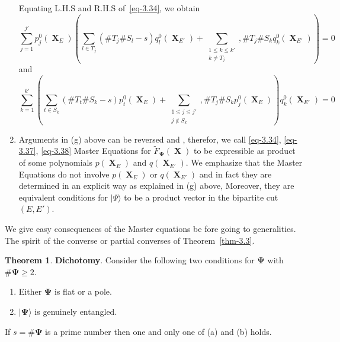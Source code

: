 \documentclass[a4paper,12pt]{article}
\DeclareMathOperator{\x}{\mathrm{X}}
\theoremstyle{definition}
\theoremstyle{underlinethm}
\newtheorem{thm}{Theorem}[section]
\theoremstyle{definition}
\begin{document}
\begin{enumerate}[label=(\alph*)]
Equating L.H.S  and R.H.S of~\eqref{eq-3.34}, we obtain
\begin{equation}
\sum_{j=1}^{j'} p_{j}^{0}(\boldsymbol{\x}_{E}) \left(\sum_{l\in T_{j}} (\# T_{j} \# S_{l} -s) q_{l}^{0}(\boldsymbol{\x}_{E'}) + \sum_{\substack{1 \leq k \leq k' \\ k \neq T_{j}}}, \# T_{j} \# S_{k} q_{k}^{0} (\boldsymbol{\x}_{E'}) \right) = 0 \tag{3.37}\label{eq-3.37}
\end{equation}
and
\begin{equation}
\sum_{k=1}^{k'} \left(\sum_{t \in S_{k}} (\# T_{t} \# S_{k} -s) p_{t}^{0}(\boldsymbol{\x}_{E}) +  \sum_{\substack{1 \leq j \leq j' \\ j \notin S_{k}}}, \# T_{j} \# S_{k}  p_{j}^{0}(\boldsymbol{\x}_{E})\right) q_{k}^{0}(\boldsymbol{\x}_{E'}) = 0\tag{3.38}\label{eq-3.38}
\end{equation}

\item Arguments in (g) above can be reversed and , therefor, we call \eqref{eq-3.34}, \eqref{eq-3.37}, \eqref{eq-3.38} Master Equations for $\widetilde{F}_{\boldsymbol{\Psi}}(\boldsymbol{\x})$ to be expressible as product of some polynomials $p(\boldsymbol{\x}_{E})$ and $q(\boldsymbol{\x}_{E'})$. We emphasize that the Master Equations do not involve $p(\boldsymbol{\x}_{E})$ or $q(\boldsymbol{\x}_{E'})$ and in  fact they are determined in an explicit way as explained in (g) above, Moreover, they are equivalent conditions for $| \Psi \rangle$ to be a product vector in the bipartite cut $(E, E')$.
\end{enumerate}


We give easy consequences of the Master equations be fore going to generalities. The spirit of the converse or partial converses of Theorem~\ref{thm-3.3}.

\begin{thm}\label{thm-3.4}
\textbf{Dichotomy}. Consider the following two conditions for $\boldsymbol{\Psi}$ with $\# \boldsymbol{\Psi} \geq 2$.
\begin{enumerate}[label=(\alph*)]

\item Either $\boldsymbol{\Psi}$ is flat or a pole.

\item $| \boldsymbol{\Psi} \rangle$ is genuinely entangled.

\end{enumerate}

If $s=\# \boldsymbol{\Psi}$ is a prime number then one and only one of (a) and (b) holds.

\end{thm}
\end{document}
